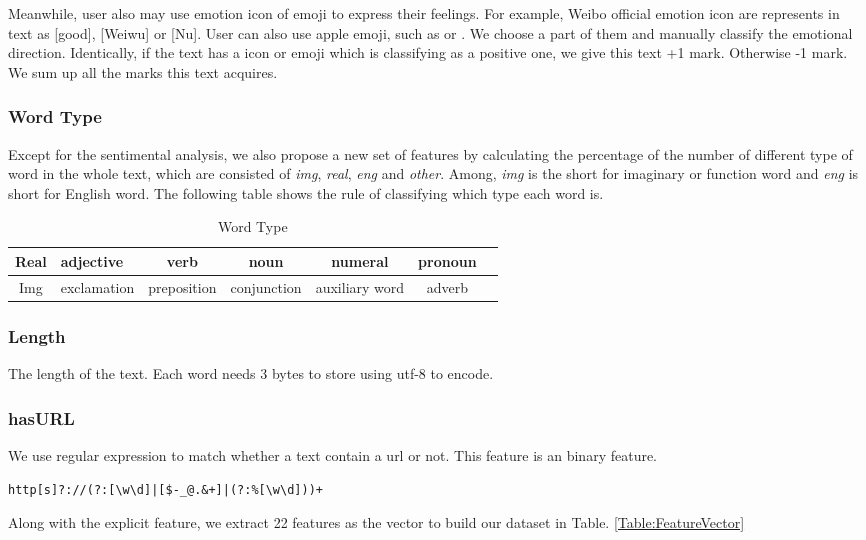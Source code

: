 Meanwhile, user also may use emotion icon of emoji to express their feelings. For example, Weibo official emotion icon are represents in text as [good], [Weiwu] or [Nu]. User can also use apple emoji, such as  or . We choose a part of them and manually classify the emotional direction. Identically, if the text has a icon or emoji which is classifying as a positive one, we give this text +1 mark. Otherwise -1 mark. We sum up all the marks this text acquires.

\subsubsection{Word Type}
Except for the sentimental analysis, we also propose a new set of features by calculating the percentage of the number of different type of word in the whole text, which are consisted of \textit{img}, \textit{real}, \textit{eng} and \textit{other}. Among, \textit{img} is the short for imaginary or function word and \textit{eng} is short for English word. The following table shows the rule of classifying which type each word is.
\begin{table}[!hbp] \centering
\begin{tabular}{|cIc|c|c|c|c|}
\hline
Real & adjective & verb & noun & numeral & pronoun\\
\hline
Img & exclamation & preposition & conjunction & auxiliary word & adverb\\
\hline
\end{tabular}
\caption{Word Type}
\end{table}

\subsubsection{Length}
The length of the text. Each word needs 3 bytes to store using utf-8 to encode.

\subsubsection{hasURL}
We use regular expression to match whether a text contain a url or not. 
This feature is an binary feature.
\begin{lstlisting}
http[s]?://(?:[\w\d]|[$-_@.&+]|(?:%[\w\d]))+
\end{lstlisting}

Along with the explicit feature, we extract 22 features as the vector to build our dataset in Table. \ref{Table:FeatureVector}

